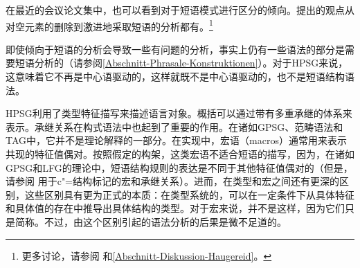 在最近的会议论文集中，也可以看到对于短语模式进行区分的倾向。提出的观点从对空元素的删除到激进地采取短语的分析都有。\footnote{%
更多讨论，请参阅 和\ref{Abschnitt-Diskussion-Haugereid}。
}

即使倾向于短语的分析会导致一些有问题的分析，事实上仍有一些语法的部分是需要短语分析的（请参阅\ref{Abschnitt-Phrasale-Konstruktionen}）。对于HPSG来说，这意味着它不再是中心语驱动的，这样就既不是中心语驱动的，也不是短语结构语法。

HPSG利用了类型特征描写来描述语言对象。概括可以通过带有多重承继的体系来表示。承继关系在构式语法\indexcxgc 中也起到了重要的作用。在诸如GPSG\indexgpsgc、范畴语法\indexcgc  和TAG\indextagc 中，它并不是理论解释的一部分。在实现中，宏语（macros）通常用来表示共现的特征值偶对\citep*{DKK2004a}。按照假定的构架，这类宏语不适合短语的描写，因为，在诸如GPSG\indexgpsgc 和LFG\indexlfgc 的理论中，短语结构规则的表达是不同于其他特征值偶对的（但是，请参阅 用于c"=结构标记的宏和承继关系）。进而，在类型和宏之间还有更深的区别，这些区别具有更为正式的本质：在类型系统的，可以在一定条件下从具体特征和具体值的存在中推导出具体结构的类型。对于宏来说，并不是这样，因为它们只是简称。不过，由这个区别引起的语法分析的后果是微不足道的。

